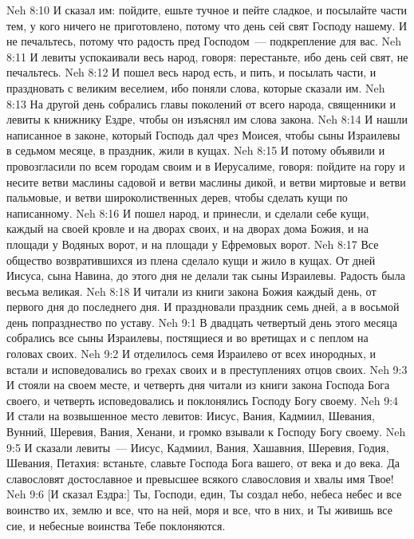 \vs Neh 8:10 И сказал им: пойдите, ешьте тучное и пейте сладкое, и посылайте части тем, у кого ничего не приготовлено, потому что день сей свят Господу нашему. И не печальтесь, потому что радость пред Господом~--- подкрепление для вас.
\vs Neh 8:11 И левиты успокаивали весь народ, говоря: перестаньте, ибо день сей свят, не печальтесь.
\vs Neh 8:12 И пошел весь народ есть, и пить, и посылать части, и праздновать с великим веселием, ибо поняли слова, которые сказали им.
\rsbpar\vs Neh 8:13 На другой день собрались главы поколений от всего народа, священники и левиты к книжнику Ездре, чтобы он изъяснял им слова закона.
\vs Neh 8:14 И нашли написанное в законе, который Господь дал чрез Моисея, чтобы сыны Израилевы в седьмом месяце, в праздник, жили в кущах.
\vs Neh 8:15 И потому объявили и провозгласили по всем городам своим и в Иерусалиме, говоря: пойдите на гору и несите ветви маслины садовой и ветви маслины дикой, и ветви миртовые и ветви пальмовые, и ветви  широколиственных дерев, чтобы сделать кущи по написанному.
\vs Neh 8:16 И пошел народ, и принесли, и сделали себе кущи, каждый на своей кровле и на дворах своих, и на дворах дома Божия, и на площади у Водяных ворот, и на площади у Ефремовых ворот.
\vs Neh 8:17 Все общество возвратившихся из плена сделало кущи и жило в кущах. От дней Иисуса, сына Навина, до этого дня не делали так сыны Израилевы. Радость была весьма великая.
\vs Neh 8:18 И читали из книги закона Божия каждый день, от первого дня до последнего дня. И праздновали праздник семь дней, а в восьмой день попразднество по уставу.
\vs Neh 9:1 В двадцать четвертый день этого месяца собрались все сыны Израилевы, постящиеся и во вретищах и с пеплом на головах своих.
\vs Neh 9:2 И отделилось семя Израилево от всех инородных, и встали и исповедовались во грехах своих и в преступлениях отцов своих.
\vs Neh 9:3 И стояли на своем месте, и четверть дня читали из книги закона Господа Бога своего, и четверть исповедовались и поклонялись Господу Богу своему.
\vs Neh 9:4 И стали на возвышенное место левитов: Иисус, Вания, Кадмиил, Шевания, Вунний, Шеревия, Вания, Хенани, и громко взывали к Господу Богу своему.
\vs Neh 9:5 И сказали левиты~--- Иисус, Кадмиил, Вания, Хашавния, Шеревия, Годия, Шевания, Петахия: встаньте, славьте Господа Бога вашего, от века и до века. Да славословят достославное и превысшее всякого славословия и хвалы имя Твое!
\vs Neh 9:6 [И сказал Ездра:] Ты, Господи, един, Ты создал небо, небеса небес и все воинство их, землю и все, что на ней, моря и все, что в них, и Ты живишь все сие, и небесные воинства Тебе поклоняются.
